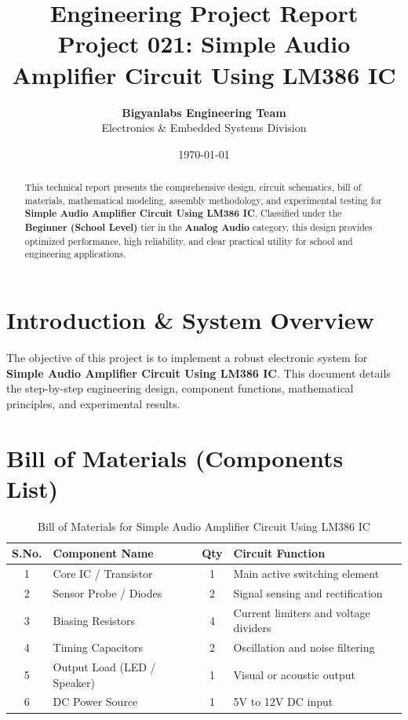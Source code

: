 \documentclass[11pt,a4paper]{article}
\title{\textbf{\Huge Engineering Project Report}\\[0.5em] \Large Project 021: Simple Audio Amplifier Circuit Using LM386 IC}
\author{\textbf{Bigyanlabs Engineering Team}\\ Electronics \& Embedded Systems Division}
\date{\today}
\begin{document}
\maketitle
\thispagestyle{empty}

\begin{abstract}
This technical report presents the comprehensive design, circuit schematics, bill of materials, mathematical modeling, assembly methodology, and experimental testing for \textbf{Simple Audio Amplifier Circuit Using LM386 IC}. Classified under the \textbf{Beginner (School Level)} tier in the \textbf{Analog Audio} category, this design provides optimized performance, high reliability, and clear practical utility for school and engineering applications.
\end{abstract}

\newpage
\tableofcontents
\newpage

\section{Introduction \& System Overview}
The objective of this project is to implement a robust electronic system for \textbf{Simple Audio Amplifier Circuit Using LM386 IC}. This document details the step-by-step engineering design, component functions, mathematical principles, and experimental results.

\section{Bill of Materials (Components List)}
\begin{table}[h!]
\centering
\caption{Bill of Materials for Simple Audio Amplifier Circuit Using LM386 IC}
\vspace{0.5em}
\begin{tabular}{clcp{7cm}}
\toprule
\textbf{S.No.} & \textbf{Component Name} & \textbf{Qty} & \textbf{Circuit Function} \\
\midrule
1 & Core IC / Transistor & 1 & Main active switching element \\
2 & Sensor Probe / Diodes & 2 & Signal sensing and rectification \\
3 & Biasing Resistors & 4 & Current limiters and voltage dividers \\
4 & Timing Capacitors & 2 & Oscillation and noise filtering \\
5 & Output Load (LED / Speaker) & 1 & Visual or acoustic output \\
6 & DC Power Source & 1 & 5V to 12V DC input \\
\bottomrule
\end{tabular}
\end{table}
\end{document}
